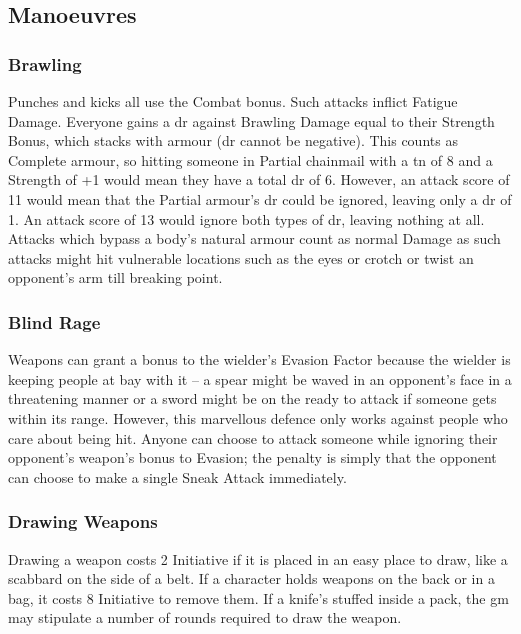 \begin{multicols}{2}
\subsection{Manoeuvres}

\subsubsection{Brawling}

Punches and kicks all use the Combat bonus. Such attacks inflict Fatigue Damage. Everyone gains a \gls{dr} against Brawling Damage equal to their Strength Bonus, which stacks with armour (\gls{dr} cannot be negative). This counts as Complete armour, so hitting someone in Partial chainmail with a \gls{tn} of 8 and a Strength of +1 would mean they have a total \gls{dr} of 6. However, an attack score of 11 would mean that the Partial armour's \gls{dr} could be ignored, leaving only a \gls{dr} of 1. An attack score of 13 would ignore both types of \gls{dr}, leaving nothing at all. Attacks which bypass a body's natural armour count as normal Damage as such attacks might hit vulnerable locations such as the eyes or crotch or twist an opponent's arm till breaking point.

\subsubsection{Blind Rage}\label{blind}

Weapons can grant a bonus to the wielder's Evasion Factor because the wielder is keeping people at bay with it -- a spear might be waved in an opponent's face in a threatening manner or a sword might be on the ready to attack if someone gets within its range.
However, this marvellous defence only works against people who care about being hit.
Anyone can choose to attack someone while ignoring their opponent's weapon's bonus to Evasion; the penalty is simply that the opponent can choose to make a single Sneak Attack immediately.

\subsubsection{Drawing Weapons}

Drawing a weapon costs 2 Initiative if it is placed in an easy place to draw, like a scabbard on the side of a belt. If a character holds weapons on the back or in a bag, it costs 8 Initiative to remove them. If a knife's stuffed inside a pack, the \gls{gm} may stipulate a number of \glspl{round} required to draw the weapon.


\end{multicols}
